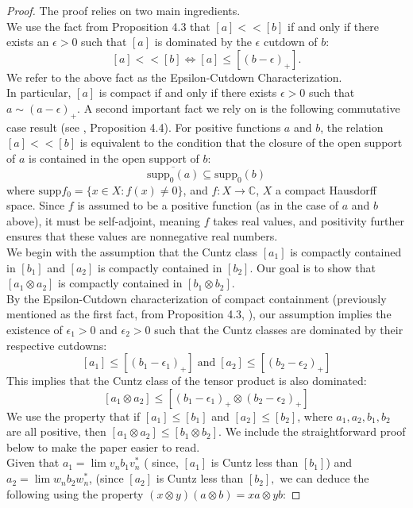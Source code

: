 \documentclass{iopconfser}
\theoremstyle{definition}
\begin{document}
\begin{proof}
    

The proof relies on two main ingredients.\\
\indent We use the fact from Proposition 4.3 \cite{GarPer} that $[a] << [b]$ if and only if there exists an $\epsilon >0$ such that $[a]$ is dominated by the $\epsilon$ cutdown of $b$: $$[a] << [b] \Longleftrightarrow [a] \leq [(b-\epsilon)_+].$$
 We refer to the above fact as the Epsilon-Cutdown Characterization.\\
 
 In particular, $[a]$ is compact if and only if there exists $\epsilon >0$ such that $a \sim (a-\epsilon)_+$.
A second important fact we rely on is the following commutative case result (see \cite{GarPer}, Proposition 4.4). For positive functions $a$ and $b$, the relation $[a] << [b]$  is equivalent to the condition that the closure of the open support of $a$ is contained in the open support of $b$:
$$ \overline{\mathrm{supp}_0(a)} \subseteq \mathrm{supp}_0 (b)$$
where $\mathrm{supp}f_0=\{x \in X: f(x) \neq 0\}$, and $f:X \rightarrow \mathbb{C}$, $X$ a compact Hausdorff space. Since $f$ is assumed to be a positive function (as in the case of $a$ and $b$ above), it must be self-adjoint, meaning $f$ takes real values, and positivity further ensures that these values are nonnegative real numbers.\\

We begin with the assumption that the Cuntz class $[a_1]$  is compactly contained in $[b_1]$  and $[a_2]$  is compactly contained in $[b_2]$. Our goal is to show that $[a_1 \otimes a_2]$ is compactly contained in $[b_1 \otimes b_2]$.\\
 By the Epsilon-Cutdown characterization of compact containment (previously mentioned as the first fact, from Proposition 4.3, \cite {GarPer}), our assumption implies the existence of $\epsilon_1 >0$ and $\epsilon_2 >0$ such that the Cuntz classes are dominated by their respective cutdowns:
    $$[a_1] \leq [(b_1 -\epsilon_1)_+] \;\mathrm{and}\; [a_2] \leq [(b_2-   \epsilon_2)_+]$$
    This implies that the Cuntz class of the tensor product is also dominated:
    $$[a_1 \otimes a_2] \leq [(b_1 - \epsilon_1)_+ \otimes (b_2 -\epsilon_2)_+]$$
We use the property that if $[a_1] \leq [b_1]$ and $[a_2] \leq [b_2]$, where $a_1, a_2, b_1, b_2$ are all positive, then $[a_1 \otimes a_2]  \leq [b_1 \otimes b_2]$. We include the straightforward proof below to make the paper easier to read.\\
Given that $a_1=\lim v_n b_1 v_n^*$  ( since, $[a_1]$ is Cuntz less than $[b_1]$) and $a_2=\lim w_n b_2 w_n^*$, (since $[a_2]$ is Cuntz less than $[b_2],$ we can deduce the following using the property $(x\otimes y)(a \otimes b)=xa \otimes yb$:


\end{proof}
\end{document}
